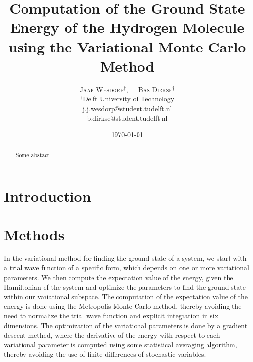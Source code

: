\documentclass[twoside]{article}
\title{\vspace{-15mm}\fontsize{18pt}{10pt}\selectfont\textbf{Computation of the Ground State Energy of the Hydrogen Molecule using the Variational Monte Carlo Method}} %
\author{
	\large
	\textsc{Jaap Wesdorp}$^\dagger$, $\hspace{10pt}$ \textsc{Bas Dirkse}$^\dagger$ \\ %
	\normalsize $^\dagger$Delft University of Technology \\ %
	\normalsize \href{mailto:j.j.wesdorp@student.tudelft.nl}{j.j.wesdorp@student.tudelft.nl} \\
	\normalsize \href{mailto:b.dirkse@student.tudelft.nl}{b.dirkse@student.tudelft.nl} 
}
\date{\today\vspace{-8mm}}
\begin{document}


\maketitle %
\thispagestyle{firststyle} %


\begin{abstract}
\noindent  
Some abstact

	
\end{abstract}


\section{Introduction}



\section{Methods}
In the variational method for finding the ground state of a system, we start with a trial wave function of a specific form, which depends on one or more variational parameters. We then compute the expectation value of the energy, given the Hamiltonian of the system and optimize the parameters to find the ground state within our variational subspace. The computation of the expectation value of the energy is done using the Metropolis Monte Carlo method, thereby avoiding the need to normalize the trial wave function and explicit integration in six dimensions. The optimization of the variational parameters is done by a gradient descent method, where the derivative of the energy with respect to each variational parameter is computed using some statistical averaging algorithm, thereby avoiding the use of finite differences of stochastic variables. 
\end{document}
